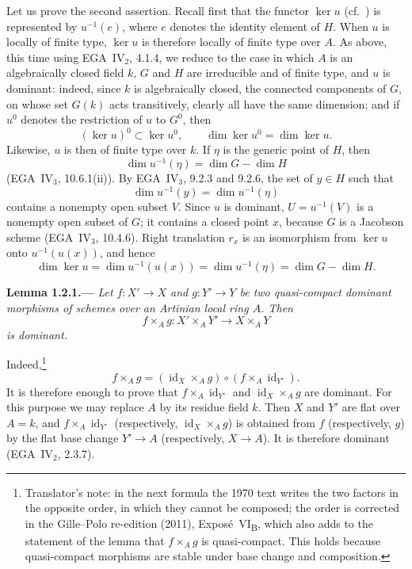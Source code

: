 Let us prove the second assertion. Recall first that the functor
\(\ker u\) (cf.\ ) is represented by
\(u^{-1}(e)\), where \(e\) denotes the identity element of \(H\).
When \(u\) is locally of finite type, \(\ker u\) is therefore
locally of finite type over \(A\). As above, this time using
EGA~IV\(_2\), 4.1.4, we reduce to the case in which \(A\) is an
algebraically closed field \(k\), \(G\) and \(H\) are irreducible and of
finite type, and \(u\) is dominant: indeed, since \(k\) is
algebraically closed, the connected components of \(G\), on whose
set \(G(k)\) acts transitively, clearly all have the same dimension;
and if \(u^0\) denotes the restriction of \(u\) to \(G^0\), then
\[
  (\ker u)^0\subset\ker u^0,
  \qquad
  \dim\ker u^0=\dim\ker u.
\]
Likewise, \(u\) is then of finite type over \(k\). If \(\eta\) is
the generic point of \(H\), then
\[
  \dim u^{-1}(\eta)=\dim G-\dim H
\]
(EGA~IV\(_3\), 10.6.1(ii)). By EGA~IV\(_3\), 9.2.3 and 9.2.6, the
set of \(y\in H\) such that
\[
  \dim u^{-1}(y)=\dim u^{-1}(\eta)
\]
contains a nonempty open subset \(V\). Since \(u\) is dominant,
\(U=u^{-1}(V)\) is a nonempty open subset of \(G\); it contains a
closed point \(x\), because \(G\) is a Jacobson scheme
(EGA~IV\(_3\), 10.4.6). Right translation \(r_x\) is an isomorphism
from \(\ker u\) onto \(u^{-1}(u(x))\), and hence
\[
  \dim\ker u
    =\dim u^{-1}(u(x))
    =\dim u^{-1}(\eta)
    =\dim G-\dim H.
\]

\medskip
{}\label{lem:sga3-VIB-1.2.1}%
\noindent\textbf{Lemma 1.2.1.---}
\emph{Let \(f:X'\to X\) and \(g:Y'\to Y\) be two quasi-compact
dominant morphisms of schemes over an Artinian local ring \(A\).
Then}
\[
  f\times_Ag:X'\times_A Y'\longrightarrow X\times_A Y
\]
\emph{is dominant.}

Indeed,\footnote{Translator's note: in the next formula the 1970 text writes the two factors in
the opposite order, in which they cannot be composed; the order is corrected in the Gille--Polo
re-edition (2011), Expos\'e~VI\textsubscript{B}, which also adds to the statement of the lemma that
\(f\times_Ag\) is quasi-compact. This holds because quasi-compact morphisms are stable under base change
and composition.}
\[
  f\times_Ag
    =
  (\operatorname{id}_X\times_Ag)
    \circ
  (f\times_A\operatorname{id}_{Y'}).
\]
It is therefore enough to prove that
\(f\times_A\operatorname{id}_{Y'}\) and
\(\operatorname{id}_X\times_Ag\) are dominant. For this purpose we
may replace \(A\) by its residue field \(k\). Then \(X\) and \(Y'\)
are flat over \(A=k\), and
\(f\times_A\operatorname{id}_{Y'}\)
(respectively, \(\operatorname{id}_X\times_Ag\)) is obtained from
\(f\) (respectively, \(g\)) by the flat base change \(Y'\to A\)
(respectively, \(X\to A\)). It is therefore dominant
(EGA~IV\(_2\), 2.3.7).
